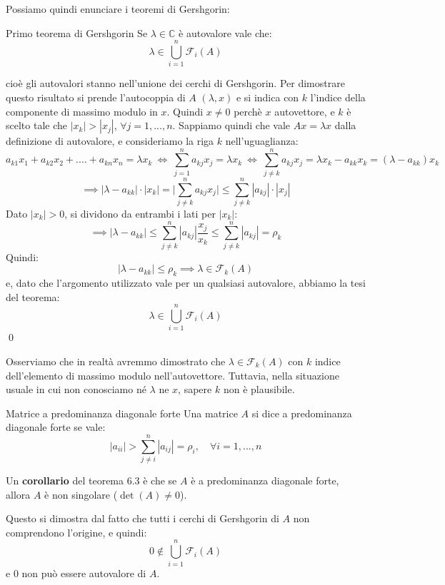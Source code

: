\documentclass[a4paper,11pt]{article}
\begin{document}
Possiamo quindi enunciare i teoremi di Gershgorin:
\begin{theorem}{Primo teorema di Gershgorin}
	Se $\lambda \in \mathbb{C}$ è autovalore vale che:
	$$
	\lambda \in \bigcup_{i = 1}^n \mathcal{F}_i(A)
	$$
\end{theorem}
cioè gli autovalori stanno nell'unione dei cerchi di Gershgorin.
Per dimostrare questo risultato si prende l'autocoppia di $A$ $(\lambda, x)$ e si indica con $k$ l'indice della componente di massimo modulo in $x$.
Quindi $x \neq 0$ perchè $x$ autovettore, e $k$ è scelto tale che $|x_k| > |x_j|$, $\forall j = 1, ..., n$.
Sappiamo quindi che vale $Ax = \lambda x$ dalla definizione di autovalore, e consideriamo la riga $k$ nell'uguaglianza:
$$
a_{k1} x_1 + a_{k2} x_2 + .... + a_{kn} x_n = \lambda x_k \ \Leftrightarrow \ \sum_{j = 1}^n a_{kj} x_j = \lambda x_k \ \Leftrightarrow \ \sum_{j \neq k}^{n} a_{kj} x_j = \lambda x_k - a_{kk} x_k = (\lambda - a_{kk}) x_k
$$
$$
\implies |\lambda - a_{kk}| \cdot |x_k| = \Big| \sum_{j \neq k}^n a_{kj}x_j \Big| \leq \sum_{j \neq k}^n |a_{kj}| \cdot |x_j|
$$
Dato $|x_k| > 0$, si dividono da entrambi i lati per $|x_k|$:
$$
\implies |\lambda - a_{kk}| \leq \sum_{j \neq k}^n |a_{kj}| \frac{x_j}{x_k} \leq \sum_{j \neq k}^n |a_{kj}| = \rho_k
$$
Quindi:
$$
|\lambda - a_{kk}| \leq \rho_k \implies \lambda \in \mathcal{F}_k(A)
$$
e, dato che l'argomento utilizzato vale per un qualsiasi autovalore, abbiamo la tesi del teorema:
$$
\lambda \in \bigcup_{i = 1}^n \mathcal{F}_i(A)
$$ \qed

Osserviamo che in realtà avremmo dimostrato che $\lambda \in \mathcal{F}_k(A)$ con $k$ indice dell'elemento di massimo modulo nell'autovettore.
Tuttavia, nella situazione usuale in cui non conosciamo né $\lambda$ ne $x$, sapere $k$ non è plausibile.

\begin{definition}{Matrice a predominanza diagonale forte}
	Una matrice $A$ si dice a predominanza diagonale forte se vale:
	$$
	|a_{ii}| > \sum_{j \neq i}^n |a_{ij}| = \rho_i, \quad \forall i = 1, ..., n
	$$
\end{definition}

Un \textbf{corollario} del teorema 6.3 è che se $A$ è a predominanza diagonale forte, allora $A$ è non singolare ($\det(A) \neq 0$).

Questo si dimostra dal fatto che tutti i cerchi di Gershgorin di $A$ non comprendono l'origine, e quindi:
$$
0 \not \in \bigcup_{i = 1}^n \mathcal{F}_i (A)
$$
e 0 non può essere autovalore di $A$.
\end{document}
